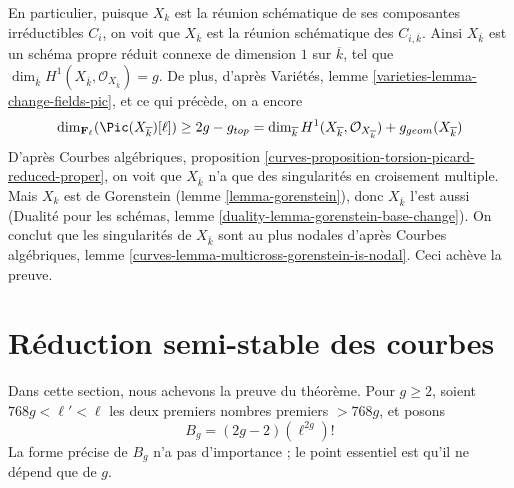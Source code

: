 \medskip\noindent
En particulier, puisque $X_k$ est la réunion schématique de ses composantes
irréductibles $C_i$, on voit que $X_{\overline{k}}$ est la réunion
schématique des $C_{i,\overline{k}}$. Ainsi $X_{\overline{k}}$ est un
schéma propre réduit connexe de dimension $1$ sur $\overline{k}$, tel que
$\dim_{\overline{k}}H^1(X_{\overline{k}},
\mathcal{O}_{X_{\overline{k}}})=g$. De plus, d'après Variétés, lemme
\ref{varieties-lemma-change-fields-pic}, et ce qui précède, on a encore
$$
\dim_{\mathbf{F}_\ell}(\Pic(X_{\overline{k}})[\ell])
\geq 2g - g_{top} =
\dim_{\overline{k}} H^1(X_{\overline{k}}, \mathcal{O}_{X_{\overline{k}}})
+ g_{geom}(X_{\overline{k}})
$$
D'après Courbes algébriques, proposition
\ref{curves-proposition-torsion-picard-reduced-proper}, on voit que
$X_{\overline{k}}$ n'a que des singularités en croisement multiple.
Mais $X_k$ est de Gorenstein (lemme \ref{lemma-gorenstein}), donc
$X_{\overline{k}}$ l'est aussi (Dualité pour les schémas, lemme
\ref{duality-lemma-gorenstein-base-change}). On conclut que les singularités
de $X_{\overline{k}}$ sont au plus nodales d'après Courbes algébriques,
lemme \ref{curves-lemma-multicross-gorenstein-is-nodal}. Ceci achève la
preuve.









\section{Réduction semi-stable des courbes}
\label{section-semistable-reduction-theorem}

\noindent
Dans cette section, nous achevons la preuve du théorème. Pour $g\geq2$,
soient $768g<\ell'<\ell$ les deux premiers nombres premiers $>768g$, et
posons
\begin{equation}
\label{equation-bound}
B_g = (2g - 2)(\ell^{2g})!
\end{equation}
La forme précise de $B_g$ n'a pas d'importance ; le point essentiel est
qu'il ne dépend que de $g$.

